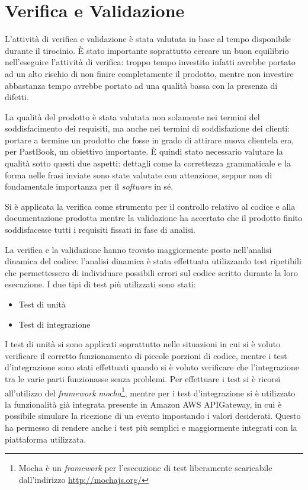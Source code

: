 
\chapter{Verifica e Validazione}

L'attività di verifica e validazione è stata valutata in base al tempo
disponibile durante il tirocinio. È stato importante soprattutto cercare un
buon equilibrio nell'eseguire l'attività di verifica: troppo tempo investito
infatti avrebbe portato ad un alto rischio di non finire completamente il
prodotto, mentre non investire abbastanza tempo avrebbe portato ad una qualità
bassa con la presenza di difetti.

La qualità del prodotto è stata valutata non solamente nei termini del
soddisfacimento dei requisiti, ma anche nei termini di soddisfazione dei
clienti: portare a termine un prodotto che fosse in grado di attirare nuova
clientela era, per PastBook, un obiettivo importante. È quindi stato necessario
valutare la qualità sotto questi due aspetti: dettagli come la correttezza
grammaticale e la forma nelle frasi inviate sono state valutate con attenzione,
seppur non di fondamentale importanza per il \textit{software} in sé.

Si è applicata la verifica come strumento per il controllo relativo
al codice e alla documentazione prodotta mentre la validazione ha accertato
che il prodotto finito soddisfacesse tutti i requisiti fissati in fase di
analisi.

La verifica e la validazione hanno trovato maggiormente posto nell'analisi
dinamica del codice: l'analisi dinamica è stata effettuata utilizzando test
ripetibili che permettessero di individuare possibili errori sul codice
scritto durante la loro esecuzione.
I due tipi di test più utilizzati sono stati:
\begin{itemize}
  \item Test di unità
  \item Test di integrazione
\end{itemize}
I test di unità si sono applicati soprattutto nelle situazioni in cui si è
voluto verificare il corretto funzionamento di piccole porzioni di codice,
mentre i test d'integrazione sono stati effettuati quando si è voluto
verificare che l'integrazione tra le varie parti funzionasse senza problemi.
Per effettuare i test si è ricorsi all'utilizzo del \textit{framework}
\textit{mocha}\footnote{Mocha è un \textit{framework} per l'esecuzione di test
liberamente scaricabile dall'indirizzo \url{http://mochajs.org/}},
mentre per i test d'integrazione si è utilizzato la funzionalità già integrata
presente in Amazon AWS APIGateway, in cui è possibile simulare la ricezione di
un evento impostando i valori desiderati. Questo ha permesso di rendere anche i
test più semplici e maggiormente integrati con la piattaforma utilizzata.


